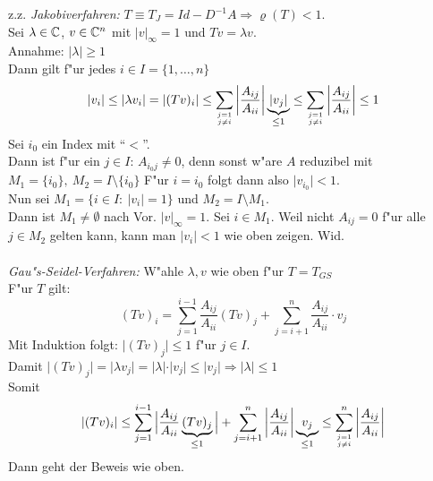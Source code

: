 \documentclass{scrartcl}
\begin{document}
\begin{Bew}
\begin{iaufz}
\setcounter{enumi}{1}
\item z.z. \emph{Jakobiverfahren:} $T \equiv T_J = Id - D^{-1} A \Rightarrow \varrho(T) < 1$. \\
Sei $\lambda \in \mathbb{C}$, $v \in \mathbb{C}^n$ mit $\vert v \vert_{\infty} = 1$ und $Tv = \lambda v$. \\
Annahme: $\vert \lambda \vert \geq 1$ \\
Dann gilt f"ur jedes $i \in I = \{ 1, \ldots, n \}$ 
$$\vert v_i \vert \leq \vert \lambda v_i \vert = \vert (Tv)_i \vert \leq \sum\limits_{\genfrac{}{}{0pt}{}{j=1}{j \neq i}} \left\vert \frac{A_{ij}}{A_{ii}} \right\vert \underbrace{ \vert v_j \vert }_{\leq 1} \leq \sum\limits_{\genfrac{}{}{0pt}{}{j=1}{j \neq i}} \left\vert \frac{A_{ij}}{A_{ii}} \right\vert \leq 1$$
Sei $i_0$ ein Index mit "`$<$"'. \\
Dann ist f"ur ein $j \in I$: $A_{i_0j} \neq 0$, denn sonst w"are $A$ reduzibel mit $M_1 = \{ i_0 \}, \ M_2 = I \setminus \{ i_0 \}$ 
F"ur $i=i_0$ folgt dann also $\vert v_{i_0} \vert < 1$.  \\
Nun sei $M_1 = \{ i \in I: \ \vert v_i \vert = 1 \}$ und $M_2 = I \setminus M_1$. \\
Dann ist $M_1 \neq \emptyset$ nach Vor. $\vert v \vert_\infty = 1$. Sei $i \in M_1$. Weil nicht $A_{ij} = 0$ f"ur alle $j \in M_2$ gelten kann, kann man $\vert v_i \vert < 1$ wie oben zeigen. Wid.
\\ \\
\emph{Gau"s-Seidel-Verfahren:} W"ahle $\lambda, v$ wie oben f"ur $T = T_{GS}$ \\
F"ur $T$ gilt: 
$$ (Tv)_i = \sum\limits_{j=1}^{i-1} \frac{A_{ij}}{A_{ii}} (Tv)_j + \sum\limits_{j=i+1}^n \frac{A_{ij}}{A_{ii}} \cdot v_j$$
Mit Induktion folgt: $\vert (Tv)_j \vert \leq 1$ f"ur $j \in I$. \\
Damit $\vert (Tv)_j \vert = \vert \lambda v_j \vert = \vert \lambda \vert \cdot \vert v_j \vert \leq \vert v_j \vert \Rightarrow \vert \lambda \vert \leq 1$ \\
Somit
$$\vert (Tv)_i \vert \leq \sum\limits_{j=1}^{i-1} \Big\vert \frac{A_{ij}}{A_{ii}} \underbrace{(Tv)_j}_{\leq 1} \Big\vert + \sum\limits_{j=i+1}^n \left\vert \frac{A_{ij}}{A_{ii}} \right\vert \underbrace{v_j}_{\leq 1} \leq \sum\limits_{\genfrac{}{}{0pt}{}{j=1}{j \neq i}}^n \left\vert \frac{A_{ij}}{A_{ii}} \right\vert$$
Dann geht der Beweis wie oben.
\end{iaufz}
\end{Bew}
\end{document}
